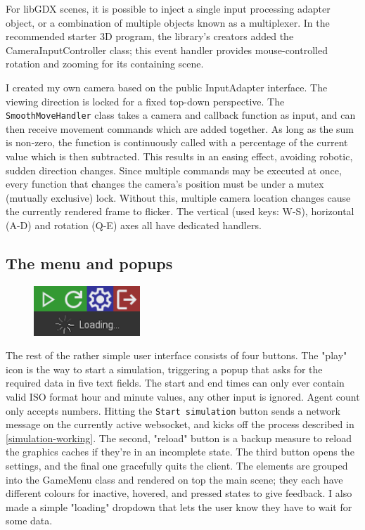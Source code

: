 For libGDX scenes, it is possible to inject a single input processing adapter object, or a combination of multiple objects known as a multiplexer. In the recommended starter 3D program\cite{basic3DlibGDX}, the library's creators added the CameraInputController class; this event handler provides mouse-controlled rotation and zooming for its containing scene.

I created my own camera based on the public InputAdapter interface. The viewing direction is locked for a fixed top-down perspective. The \verb|SmoothMoveHandler| class takes a camera and callback function as input, and can then receive movement commands which are added together. As long as the sum is non-zero, the function is continuously called with a percentage of the current value which is then subtracted. This results in an easing effect, avoiding robotic, sudden direction changes. Since multiple commands may be executed at once, every function that changes the camera's position must be under a mutex (mutually exclusive) lock. Without this, multiple camera location changes cause the currently rendered frame to flicker. The vertical (used keys: W-S), horizontal (A-D) and rotation (Q-E) axes all have dedicated handlers.


\subsection{The menu and popups}

\begin{figure}
    \includegraphics[width=4cm]{images/menu-buttons.png}
    \caption{}
\end{figure}

The rest of the rather simple user interface consists of four buttons. The "play" icon is the way to start a simulation, triggering a popup that asks for the required data in five text fields. The start and end times can only ever contain valid ISO format hour and minute values, any other input is ignored. Agent count only accepts numbers. Hitting the \verb|Start simulation| button sends a network message on the currently active websocket, and kicks off the process described in \ref{simulation-working}. The second, "reload" button is a backup measure to reload the graphics caches if they're in an incomplete state. The third button opens the settings, and the final one gracefully quits the client. The elements are grouped into the GameMenu class and rendered on top the main scene; they each have different colours for inactive, hovered, and pressed states to give feedback. I also made a simple "loading" dropdown that lets the user know they have to wait for some data.

